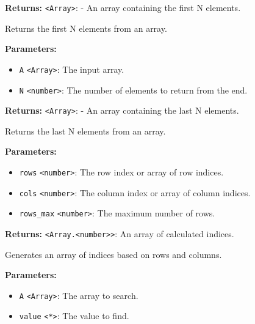 \documentclass[12pt,a4paper]{article}
\begin{document}
\noindent \textbf{Returns:} \texttt{<Array>}: - An array containing the first N elements.

\noindent Returns the first N elements from an array.

\vspace{5mm}
\noindent {}


\noindent \textbf{Parameters:}
\begin{itemize}
  \item \texttt{A} \texttt{<Array>}: The input array.
  \item \texttt{N} \texttt{<number>}: The number of elements to return from the end.
\end{itemize}

\noindent \textbf{Returns:} \texttt{<Array>}: - An array containing the last N elements.

\noindent Returns the last N elements from an array.

\vspace{5mm}
\noindent {}


\noindent \textbf{Parameters:}
\begin{itemize}
  \item \texttt{rows} \texttt{<number>}: The row index or array of row indices.
  \item \texttt{cols} \texttt{<number>}: The column index or array of column indices.
  \item \texttt{rows\_max} \texttt{<number>}: The maximum number of rows.
\end{itemize}

\noindent \textbf{Returns:} \texttt{<Array.<number>>}: An array of calculated indices.

\noindent Generates an array of indices based on rows and columns.

\vspace{5mm}
\noindent {}


\noindent \textbf{Parameters:}
\begin{itemize}
  \item \texttt{A} \texttt{<Array>}: The array to search.
  \item \texttt{value} \texttt{<*>}: The value to find.
\end{itemize}
\end{document}
